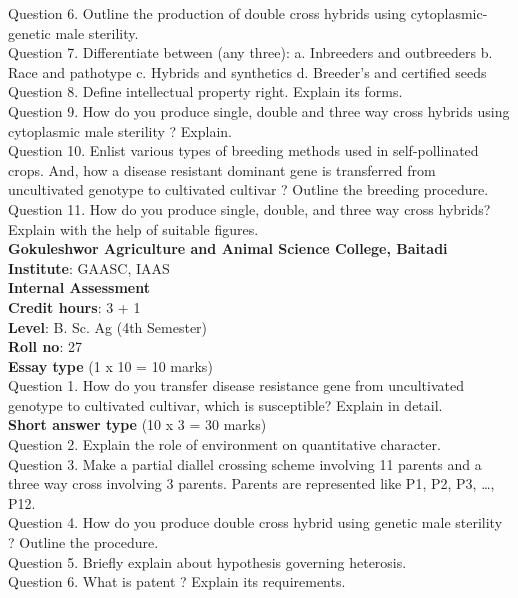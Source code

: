 \documentclass[12pt]{article}\usepackage[]{graphicx}\usepackage[]{color}
\begin{document}
Question 6. Outline the production of double cross hybrids using cytoplasmic-genetic male sterility.\\
Question 7. Differentiate between (any three): a. Inbreeders and outbreeders b. Race and pathotype c. Hybrids and synthetics d. Breeder's and certified seeds\\
Question 8. Define intellectual property right. Explain its forms.\\
Question 9. How do you produce single, double and three way cross hybrids using cytoplasmic male sterility ? Explain.\\
Question 10. Enlist various types of breeding methods used in self-pollinated crops. And, how a disease resistant dominant gene is transferred from uncultivated genotype to cultivated cultivar ? Outline the breeding procedure.\\
Question 11. How do you produce single, double, and three way cross hybrids? Explain with the help of suitable figures.\\
\clearpage 
{\centering \Large{\textbf{Gokuleshwor Agriculture and Animal Science College, Baitadi}} \\[0.25cm]
            \textbf{Institute}: GAASC, IAAS \\[0.2cm]
            \textbf{Internal Assessment} \\[0.2cm]} 
\textbf{Credit hours}: 3 + 1 \\ 
\textbf{Level}: B. Sc. Ag (4th Semester) \\
\textbf{Roll no}: 27 \\[0.5cm] 
\textbf{Essay type} (1 x 10 = 10 marks) \\
Question 1. How do you transfer disease resistance gene from uncultivated genotype to cultivated cultivar, which is susceptible? Explain in detail.\\
\textbf{Short answer type} (10 x 3 = 30 marks) \\
Question 2. Explain the role of environment on quantitative character.\\
Question 3. Make a partial diallel crossing scheme involving 11 parents and a three way cross involving 3 parents. Parents are represented like P1, P2, P3, …, P12.\\
Question 4. How do you produce double cross hybrid using genetic male sterility ? Outline the procedure.\\
Question 5. Briefly explain about hypothesis governing heterosis.\\
Question 6. What is patent ? Explain its requirements.\\
\end{document}
